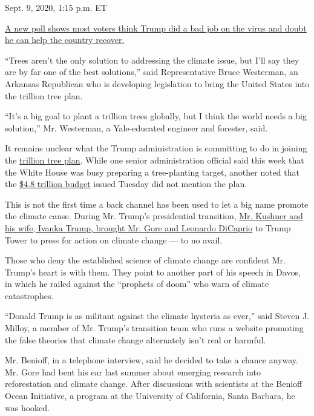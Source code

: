 Sept. 9, 2020, 1:15 p.m. ET

\href{https://www.nytimes3xbfgragh.onion/live/2020/09/09/us/trump-vs-biden\#a-new-poll-shows-most-voters-think-trump-did-a-bad-job-on-the-virus-and-doubt-he-can-help-the-country-recover}{A
new poll shows most voters think Trump did a bad job on the virus and
doubt he can help the country recover.}

``Trees aren't the only solution to addressing the climate issue, but
I'll say they are by far one of the best solutions,'' said
Representative Bruce Westerman, an Arkansas Republican who is developing
legislation to bring the United States into the trillion tree plan.

``It's a big goal to plant a trillion trees globally, but I think the
world needs a big solution,'' Mr. Westerman, a Yale-educated engineer
and forester, said.

It remains unclear what the Trump administration is committing to do in
joining the \href{https://www.1t.org/}{trillion tree plan}. While one
senior administration official said this week that the White House was
busy preparing a tree-planting target, another noted that the
\href{https://www.nytimes3xbfgragh.onion/2020/02/10/business/president-trump-budget-cuts.html}{\$4.8
trillion budget} issued Tuesday did not mention the plan.

This is not the first time a back channel has been used to let a big
name promote the climate cause. During Mr. Trump's presidential
transition,
\href{https://www.nytimes3xbfgragh.onion/2016/12/05/us/politics/climate-change-trump-al-gore.html}{Mr.
Kushner and his wife, Ivanka Trump, brought Mr. Gore and Leonardo
DiCaprio} to Trump Tower to press for action on climate change --- to no
avail.

Those who deny the established science of climate change are confident
Mr. Trump's heart is with them. They point to another part of his speech
in Davos, in which he railed against the ``prophets of doom'' who warn
of climate catastrophes.

``Donald Trump is as militant against the climate hysteria as ever,''
said Steven J. Milloy, a member of Mr. Trump's transition team who runs
a website promoting the false theories that climate change alternately
isn't real or harmful.

Mr. Benioff, in a telephone interview, said he decided to take a chance
anyway. Mr. Gore had bent his ear last summer about emerging research
into reforestation and climate change. After discussions with scientists
at the Benioff Ocean Initiative, a program at the University of
California, Santa Barbara, he was hooked.


